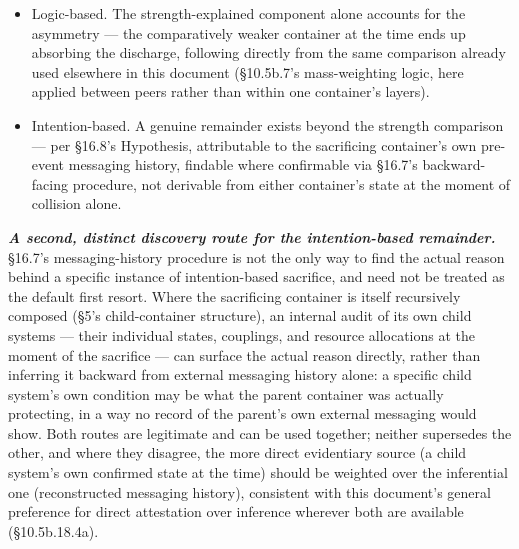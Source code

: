 \documentclass[
]{article}
\begin{document}
\begin{itemize}
\item
  Logic-based. The strength-explained component alone accounts for the
  asymmetry --- the comparatively weaker container at the time ends up
  absorbing the discharge, following directly from the same comparison
  already used elsewhere in this document (§10.5b.7's mass-weighting
  logic, here applied between peers rather than within one container's
  layers).
\item
  Intention-based. A genuine remainder exists beyond the strength
  comparison --- per §16.8's Hypothesis, attributable to the sacrificing
  container's own pre-event messaging history, findable where
  confirmable via §16.7's backward-facing procedure, not derivable from
  either container's state at the moment of collision alone.
\end{itemize}

\emph{\textbf{A second, distinct discovery route for the intention-based
remainder.}} §16.7's messaging-history procedure is not the only way to
find the actual reason behind a specific instance of intention-based
sacrifice, and need not be treated as the default first resort. Where
the sacrificing container is itself recursively composed (§5's
child-container structure), an internal audit of its own child systems
--- their individual states, couplings, and resource allocations at the
moment of the sacrifice --- can surface the actual reason directly,
rather than inferring it backward from external messaging history alone:
a specific child system's own condition may be what the parent container
was actually protecting, in a way no record of the parent's own external
messaging would show. Both routes are legitimate and can be used
together; neither supersedes the other, and where they disagree, the
more direct evidentiary source (a child system's own confirmed state at
the time) should be weighted over the inferential one (reconstructed
messaging history), consistent with this document's general preference
for direct attestation over inference wherever both are available
(§10.5b.18.4a).
\end{document}
